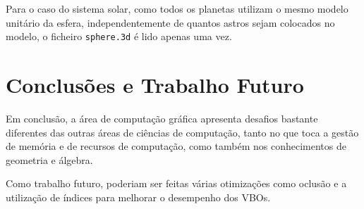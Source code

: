 \documentclass[a4paper]{article}
\begin{document}
Para o caso do sistema solar, como todos os planetas utilizam o mesmo modelo
unitário da esfera, independentemente de quantos astros sejam colocados no
modelo, o ficheiro \texttt{sphere.3d} é lido apenas uma vez.

\section{Conclusões e Trabalho Futuro}

Em conclusão, a área de computação gráfica apresenta desafios bastante
diferentes das outras áreas de ciências de computação, tanto no que toca a
gestão de memória e de recursos de computação, como também nos conhecimentos de
geometria e álgebra.

Como trabalho futuro, poderiam ser feitas várias otimizações como oclusão e a
utilização de índices para melhorar o desempenho dos VBOs.

\pagebreak



\end{document}
